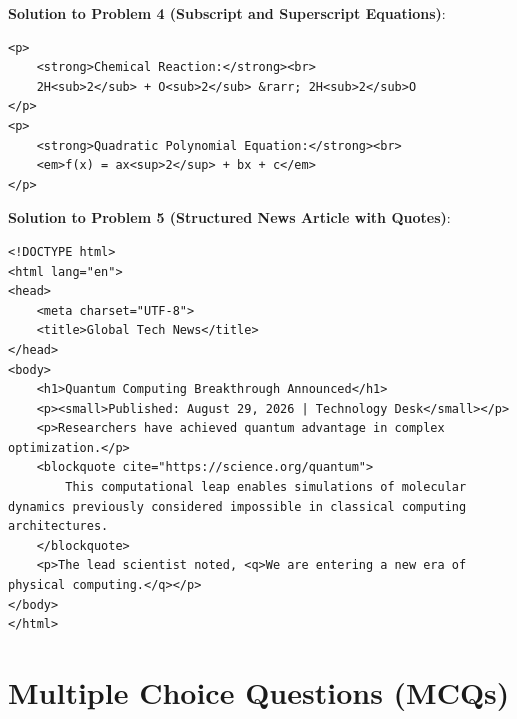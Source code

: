 \begin{solutionbox}
\noindent\textbf{Solution to Problem 4 (Subscript and Superscript Equations)}:
\begin{lstlisting}[language=HTML5]
<p>
    <strong>Chemical Reaction:</strong><br>
    2H<sub>2</sub> + O<sub>2</sub> &rarr; 2H<sub>2</sub>O
</p>
<p>
    <strong>Quadratic Polynomial Equation:</strong><br>
    <em>f(x) = ax<sup>2</sup> + bx + c</em>
</p>
\end{lstlisting}

\noindent\textbf{Solution to Problem 5 (Structured News Article with Quotes)}:
\begin{lstlisting}[language=HTML5]
<!DOCTYPE html>
<html lang="en">
<head>
    <meta charset="UTF-8">
    <title>Global Tech News</title>
</head>
<body>
    <h1>Quantum Computing Breakthrough Announced</h1>
    <p><small>Published: August 29, 2026 | Technology Desk</small></p>
    <p>Researchers have achieved quantum advantage in complex optimization.</p>
    <blockquote cite="https://science.org/quantum">
        This computational leap enables simulations of molecular dynamics previously considered impossible in classical computing architectures.
    </blockquote>
    <p>The lead scientist noted, <q>We are entering a new era of physical computing.</q></p>
</body>
</html>
\end{lstlisting}
\end{solutionbox}

\section{Multiple Choice Questions (MCQs)}

